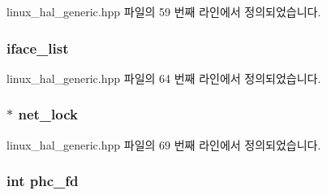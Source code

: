 linux\+\_\+hal\+\_\+generic.\+hpp 파일의 59 번째 라인에서 정의되었습니다.

\subsubsection[{\texorpdfstring{iface\+\_\+list}{iface_list}}]{ iface\+\_\+list\hspace{0.3cm}{\ttfamily [private]}}\hypertarget{class_linux_timestamper_generic_a71c6eb5a2c243c3e622503aa7c0eff67}{}\label{class_linux_timestamper_generic_a71c6eb5a2c243c3e622503aa7c0eff67}


linux\+\_\+hal\+\_\+generic.\+hpp 파일의 64 번째 라인에서 정의되었습니다.

\subsubsection[{\texorpdfstring{net\+\_\+lock}{net_lock}}]{$\ast$ net\+\_\+lock\hspace{0.3cm}{\ttfamily [private]}}\hypertarget{class_linux_timestamper_generic_a9a02854f530a2e2f70741e2970ea1fd5}{}\label{class_linux_timestamper_generic_a9a02854f530a2e2f70741e2970ea1fd5}


linux\+\_\+hal\+\_\+generic.\+hpp 파일의 69 번째 라인에서 정의되었습니다.

\subsubsection[{\texorpdfstring{phc\+\_\+fd}{phc_fd}}]{\setlength{\rightskip}{0pt plus 5cm}int phc\+\_\+fd\hspace{0.3cm}{\ttfamily [private]}}\hypertarget{class_linux_timestamper_generic_ac4500de48048f43e4cfd225a42c8bd56}{}\label{class_linux_timestamper_generic_ac4500de48048f43e4cfd225a42c8bd56}


